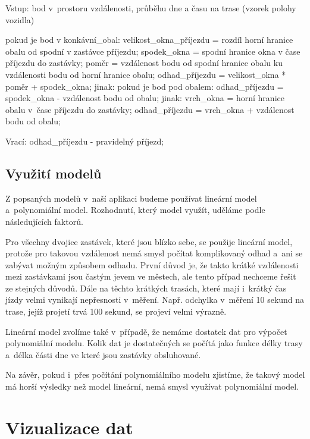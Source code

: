 \begin{code}[frame=none]
Vstup: bod v~prostoru vzdálenosti, průběhu dne
  a času na trase (vzorek polohy vozidla)


pokud je bod v konkávní_obal:
  velikost_okna_příjezdu = rozdíl horní hranice obalu od spodní
    v zastávce příjezdu;
  spodek_okna = spodní hranice okna v čase
    příjezdu do zastávky;
  poměr = vzdálenost bodu od spodní hranice obalu
    ku vzdálenosti bodu od horní hranice obalu;
  odhad_příjezdu = velikost_okna * poměr + spodek_okna;
jinak:
  pokud je bod pod obalem:
    odhad_příjezdu = spodek_okna - vzdálenost bodu od obalu;
  jinak:
    vrch_okna = horní hranice obalu
  v~čase příjezdu do zastávky;
    odhad_příjezdu = vrch_okna + vzdálenost bodu od obalu;


Vrací: odhad_příjezdu - pravidelný příjezd;
\end{code}


\subsection{Využití modelů}


Z popsaných modelů v~naší aplikaci budeme používat lineární model a~polynomiální model. Rozhodnutí, který model využít, uděláme podle následujících faktorů.


\bigbreak


Pro všechny dvojice zastávek, které jsou blízko sebe, se použije lineární model, protože pro takovou vzdálenost nemá smysl počítat komplikovaný odhad a~ani se zabývat možným způsobem odhadu. První důvod je, že takto krátké vzdálenosti mezi zastávkami jsou častým jevem ve městech, ale tento případ nechceme řešit ze stejných důvodů. Dále na těchto krátkých trasách, které mají i~krátký čas jízdy velmi vynikají nepřesnosti v~měření. Např. odchylka v~měření 10 sekund na trase, jejíž projetí trvá 100 sekund, se projeví velmi výrazně.


\bigbreak


Lineární model zvolíme také v~případě, že nemáme dostatek dat pro výpočet polynomiální modelu. Kolik dat je dostatečných se počítá jako funkce délky trasy a~délka části dne ve které jsou zastávky obsluhované.


\bigbreak


Na závěr, pokud i~přes počítání polynomiálního modelu zjistíme, že takový model má horší výsledky než model lineární, nemá smysl využívat polynomiální model.


\section{Vizualizace dat} \label{section:navrh_vizualizace}



